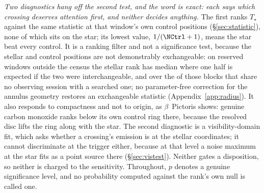 \emph{Two diagnostics hang off the second test, and the word is exact: each
says which crossing deserves attention first, and neither decides anything.}
The first ranks $T_\star$ against the same statistic at that window's own
\NCtrl{} control positions (\S\ref{sec:statistic}), none of which
sits on the star; its lowest value, $1/(\NCtrl+1)$, means the star beat every
control. It is a ranking filter and not a significance test, because the
stellar and control positions are not demonstrably exchangeable: on
\HoWin{} reserved windows outside the census the stellar
rank has median \HoRankMed{} where one half is expected if the two were
interchangeable, and \HsIndRankMed{} over the \HsIndBlocks{} of those
blocks that share no observing session with a searched one; no parameter-free
correction for the annulus geometry restores an exchangeable
statistic (Appendix~\ref{app:radius}). It
also responds to compactness and not to origin, as $\beta$~Pictoris
shows: genuine carbon monoxide ranks below its own control ring there,
because the resolved disc lifts the ring along with the star. The second
diagnostic is a visibility-domain fit, which asks whether a crossing's
emission is at the stellar coordinates; it
cannot discriminate at the trigger either, because at that level a noise
maximum at the star fits as a point source there
(\S\ref{sec:vistest}). Neither gates a
disposition, so neither is charged to the sensitivity.
Throughout, $p$ denotes a genuine significance level, and no probability
computed against the rank's own null is called one.

